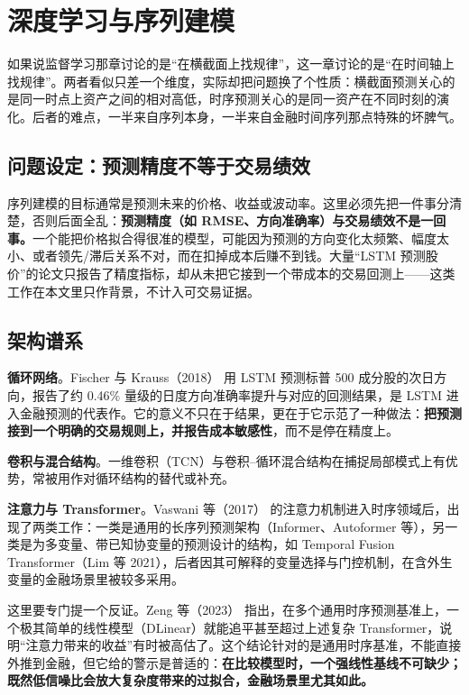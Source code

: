 \section{深度学习与序列建模}\label{sec:deep}

如果说监督学习那章讨论的是“在横截面上找规律”，这一章讨论的是“在时间轴上找规律”。两者看似只差一个维度，实际却把问题换了个性质：横截面预测关心的是同一时点上资产之间的相对高低，时序预测关心的是同一资产在不同时刻的演化。后者的难点，一半来自序列本身，一半来自金融时间序列那点特殊的坏脾气。

\subsection{问题设定：预测精度不等于交易绩效}

序列建模的目标通常是预测未来的价格、收益或波动率。这里必须先把一件事分清楚，否则后面全乱：\textbf{预测精度（如 RMSE、方向准确率）与交易绩效不是一回事。}一个能把价格拟合得很准的模型，可能因为预测的方向变化太频繁、幅度太小、或者领先/滞后关系不对，而在扣掉成本后赚不到钱。大量“LSTM 预测股价”的论文只报告了精度指标，却从未把它接到一个带成本的交易回测上——这类工作在本文里只作背景，不计入可交易证据。

\subsection{架构谱系}

\textbf{循环网络}。Fischer 与 Krauss（2018）\cite{fischerkrauss2018} 用 LSTM 预测标普 500 成分股的次日方向，报告了约 0.46\% 量级的日度方向准确率提升与对应的回测结果，是 LSTM 进入金融预测的代表作。它的意义不只在于结果，更在于它示范了一种做法：\textbf{把预测接到一个明确的交易规则上，并报告成本敏感性}，而不是停在精度上。

\textbf{卷积与混合结构}。一维卷积（TCN）与卷积--循环混合结构在捕捉局部模式上有优势，常被用作对循环结构的替代或补充。

\textbf{注意力与 Transformer}。Vaswani 等（2017）\cite{vaswani2017} 的注意力机制进入时序领域后，出现了两类工作：一类是通用的长序列预测架构（Informer\cite{zhou2021informer}、Autoformer\cite{wu2021autoformer} 等），另一类是为多变量、带已知协变量的预测设计的结构，如 Temporal Fusion Transformer（Lim 等 2021\cite{lim2021tft}），后者因其可解释的变量选择与门控机制，在含外生变量的金融场景里被较多采用。

这里要专门提一个反证。Zeng 等（2023）\cite{zeng2023dlinear} 指出，在多个通用时序预测基准上，一个极其简单的线性模型（DLinear）就能追平甚至超过上述复杂 Transformer，说明“注意力带来的收益”有时被高估了。这个结论针对的是通用时序基准，不能直接外推到金融，但它给的警示是普适的：\textbf{在比较模型时，一个强线性基线不可缺少；既然低信噪比会放大复杂度带来的过拟合，金融场景里尤其如此。}

